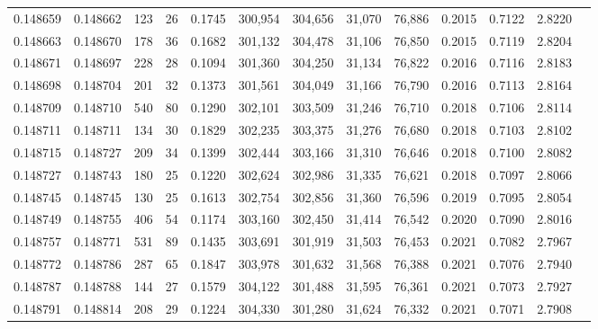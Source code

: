 \begin{tabular}{rrrrrrrrrrrrr}
0.148659 & 0.148662 &   123 &  26 &                                     0.1745 & 300,954 & 304,656 &  31,070 &  76,886 & 0.2015 & 0.7122 & 2.8220 \\
0.148663 & 0.148670 &   178 &  36 &                                     0.1682 & 301,132 & 304,478 &  31,106 &  76,850 & 0.2015 & 0.7119 & 2.8204 \\
0.148671 & 0.148697 &   228 &  28 &                                     0.1094 & 301,360 & 304,250 &  31,134 &  76,822 & 0.2016 & 0.7116 & 2.8183 \\
0.148698 & 0.148704 &   201 &  32 &                                     0.1373 & 301,561 & 304,049 &  31,166 &  76,790 & 0.2016 & 0.7113 & 2.8164 \\
0.148709 & 0.148710 &   540 &  80 &                                     0.1290 & 302,101 & 303,509 &  31,246 &  76,710 & 0.2018 & 0.7106 & 2.8114 \\
0.148711 & 0.148711 &   134 &  30 &                                     0.1829 & 302,235 & 303,375 &  31,276 &  76,680 & 0.2018 & 0.7103 & 2.8102 \\
0.148715 & 0.148727 &   209 &  34 &                                     0.1399 & 302,444 & 303,166 &  31,310 &  76,646 & 0.2018 & 0.7100 & 2.8082 \\
0.148727 & 0.148743 &   180 &  25 &                                     0.1220 & 302,624 & 302,986 &  31,335 &  76,621 & 0.2018 & 0.7097 & 2.8066 \\
0.148745 & 0.148745 &   130 &  25 &                                     0.1613 & 302,754 & 302,856 &  31,360 &  76,596 & 0.2019 & 0.7095 & 2.8054 \\
0.148749 & 0.148755 &   406 &  54 &                                     0.1174 & 303,160 & 302,450 &  31,414 &  76,542 & 0.2020 & 0.7090 & 2.8016 \\
0.148757 & 0.148771 &   531 &  89 &                                     0.1435 & 303,691 & 301,919 &  31,503 &  76,453 & 0.2021 & 0.7082 & 2.7967 \\
0.148772 & 0.148786 &   287 &  65 &                                     0.1847 & 303,978 & 301,632 &  31,568 &  76,388 & 0.2021 & 0.7076 & 2.7940 \\
0.148787 & 0.148788 &   144 &  27 &                                     0.1579 & 304,122 & 301,488 &  31,595 &  76,361 & 0.2021 & 0.7073 & 2.7927 \\
0.148791 & 0.148814 &   208 &  29 &                                     0.1224 & 304,330 & 301,280 &  31,624 &  76,332 & 0.2021 & 0.7071 & 2.7908 \\

\end{tabular}

